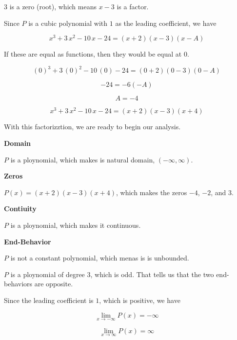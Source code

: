 \documentclass{ximera}
\begin{document}
$3$ is a zero (root), which means $x-3$ is a factor. 


Since $P$ is a cubic polynomial with $1$ as the leading coefficient, we have

\[
x^3 + 3 \, x^2 - 10 \, x - 24 = (x+2) (x-3) (x-A)
\]

If these are equal as functions, then they would be equal at $0$.


\[
(0)^3 + 3 \, (0)^2 - 10 \, (0) - 24 = (0+2) (0-3) (0-A)
\]


\[
-24 = -6 (-A)
\]


\[
A = -4
\]



\[
x^3 + 3 \, x^2 - 10 \, x - 24 = (x+2) (x-3) (x+4)
\]



With this factorizztion, we are ready to begin our analysis. 



\textbf{Domain}

$P$ is a ploynomial, which makes is natural domain, $(-\infty, \infty)$. 





\textbf{Zeros}

$P(x) = (x+2) (x-3) (x+4)$, which makes the zeros $-4$, $-2$, and $3$. 





\textbf{Contiuity}

$P$ is a ploynomial, which makes it continuous. 







\textbf{End-Behavior}


$P$ is not a constant polynomial, which menas is is unbounded. 

$P$ is a ploynomial of degree $3$, which is odd.  That tells us that the two end-behaviors are opposite. 

Since the leading coefficient is $1$, which is positive, we have


\[
\lim\limits_{x \to -\infty} P(x) = -\infty 
\]




\[
\lim\limits_{x \to \infty} P(x) = \infty 
\]
\end{document}
